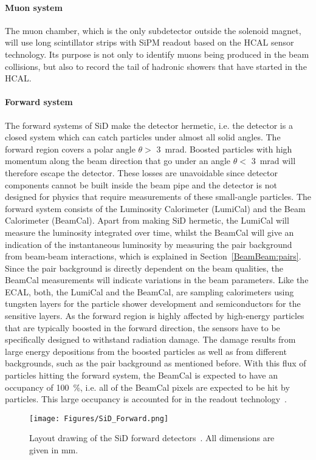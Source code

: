 \paragraph{Muon system}
The muon chamber, which is the only subdetector outside the solenoid magnet, will use long scintillator strips with SiPM readout based on the HCAL sensor technology.
Its purpose is not only to identify muons being produced in the beam collisions, but also to record the tail of hadronic showers that have started in the HCAL.

\paragraph{Forward system}
The forward systems of SiD make the detector hermetic, i.e. the detector is a closed system which can catch particles under almost all solid angles.
The forward region covers a polar angle $\theta > $ \SI{3}{\milli\radian}.
Boosted particles with high momentum along the beam direction that go under an angle $\theta < $ \SI{3}{\milli\radian} will therefore escape the detector.
These losses are unavoidable since detector components cannot be built inside the beam pipe and the detector is not designed for physics that require measurements of these small-angle particles.
The forward system consists of the Luminosity Calorimeter (LumiCal) and the Beam Calorimeter (BeamCal).
Apart from making SiD hermetic, the LumiCal will measure the luminosity integrated over time, whilst the BeamCal will give an indication of the instantaneous luminosity by measuring the \positron \electron pair background from beam-beam interactions, which is explained in Section~\ref{BeamBeam:pairs}.
Since the pair background is directly dependent on the beam qualities, the BeamCal measurements will indicate variations in the beam parameters.
Like the ECAL, both, the LumiCal and the BeamCal, are sampling calorimeters using tungsten layers for the particle shower development and semiconductors for the sensitive layers.
As the forward region is highly affected by high-energy particles that are typically boosted in the forward direction, the sensors have to be specifically designed to withstand radiation damage.
The damage results from large energy depositions from the boosted particles as well as from different backgrounds, such as the pair background as mentioned before.
With this flux of particles hitting the forward system, the BeamCal is expected to have an occupancy of \SI{100}{\percent}, i.e. all of the BeamCal pixels are expected to be hit by particles.
This large occupancy is accounted for in the readout technology~\cite[p. 133ff]{TDR4}.
\begin{figure}[h!]
\centering
\texttt{[image: Figures/SiD\_Forward.png]}
\caption[Drawing of the SiD forward detectors]{Layout drawing of the SiD forward detectors~\cite[p. 134]{TDR4}.
All dimensions are given in mm.}
\label{fig:SiD_Forward}
\end{figure}

